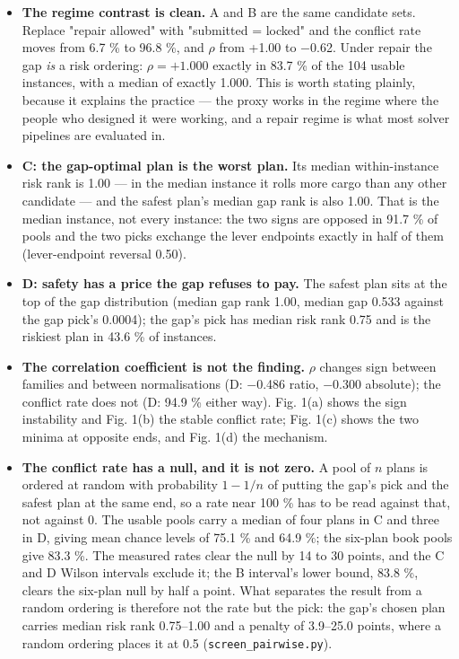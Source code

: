 \documentclass[preprint,12pt,letterpaper]{elsarticle}
\theoremstyle{definition}
\theoremstyle{plain}
\begin{document}
\begin{itemize}
\item \textbf{The regime contrast is clean.} A and B are the same candidate sets. Replace "repair allowed" with "submitted = locked" and the conflict rate moves from 6.7 \% to 96.8 \%, and $\rho$ from +1.00 to $-$0.62. Under repair the gap \textit{is} a risk ordering: $\rho = +1.000$ exactly in 83.7 \% of the 104 usable instances, with a median of exactly 1.000. This is worth stating plainly, because it explains the practice --- the proxy works in the regime where the people who designed it were working, and a repair regime is what most solver pipelines are evaluated in.
\item \textbf{C: the gap-optimal plan is the worst plan.} Its median within-instance risk rank is 1.00 --- in the median instance it rolls more cargo than any other candidate --- and the safest plan's median gap rank is also 1.00. That is the median instance, not every instance: the two signs are opposed in 91.7 \% of pools and the two picks exchange the lever endpoints exactly in half of them (lever-endpoint reversal 0.50).
\item \textbf{D: safety has a price the gap refuses to pay.} The safest plan sits at the top of the gap distribution (median gap rank 1.00, median gap 0.533 against the gap pick's 0.0004); the gap's pick has median risk rank 0.75 and is the riskiest plan in 43.6 \% of instances.
\item \textbf{The correlation coefficient is not the finding.} $\rho$ changes sign between families and between normalisations (D: $-$0.486 ratio, $-$0.300 absolute); the conflict rate does not (D: 94.9 \% either way). Fig. 1(a) shows the sign instability and Fig. 1(b) the stable conflict rate; Fig. 1(c) shows the two minima at opposite ends, and Fig. 1(d) the mechanism.
\item \textbf{The conflict rate has a null, and it is not zero.} A pool of $n$ plans is ordered at random with probability $1 - 1/n$ of putting the gap's pick and the safest plan at the same end, so a rate near 100 \% has to be read against that, not against 0. The usable pools carry a median of four plans in C and three in D, giving mean chance levels of 75.1 \% and 64.9 \%; the six-plan book pools give 83.3 \%. The measured rates clear the null by 14 to 30 points, and the C and D Wilson intervals exclude it; the B interval's lower bound, 83.8 \%, clears the six-plan null by half a point. What separates the result from a random ordering is therefore not the rate but the pick: the gap's chosen plan carries median risk rank 0.75--1.00 and a penalty of 3.9--25.0 points, where a random ordering places it at 0.5 (\texttt{screen\_\allowbreak{}pairwise.\allowbreak{}py}).
\end{itemize}
\end{document}
